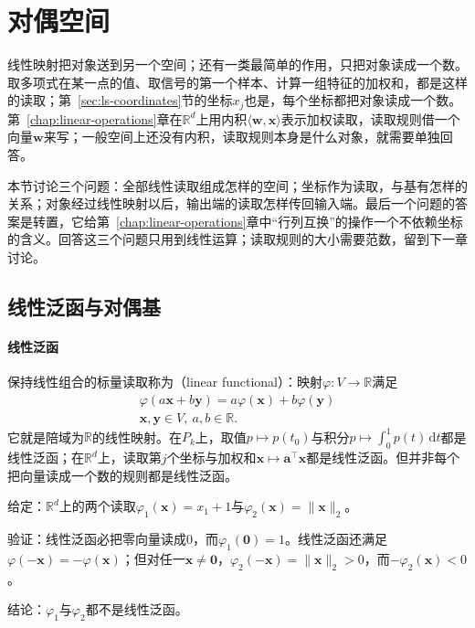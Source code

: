 
\section{对偶空间}
\label{sec:ls-dual-spaces}

线性映射把对象送到另一个空间；还有一类最简单的作用，只把对象读成一个数。取多项式在某一点的值、取信号的第一个样本、计算一组特征的加权和，都是这样的读取；第~\ref{sec:ls-coordinates}节的坐标$x_j$也是，每个坐标都把对象读成一个数。第~\ref{chap:linear-operations}章在$\mathbb R^d$上用内积$\langle\bm w,\bm x\rangle$表示加权读取，读取规则借一个向量$\bm w$来写；一般空间上还没有内积，读取规则本身是什么对象，就需要单独回答。

本节讨论三个问题：全部线性读取组成怎样的空间；坐标作为读取，与基有怎样的关系；对象经过线性映射以后，输出端的读取怎样传回输入端。最后一个问题的答案是转置，它给第~\ref{chap:linear-operations}章中“行列互换”的操作一个不依赖坐标的含义。回答这三个问题只用到线性运算；读取规则的大小需要范数，留到下一章讨论。

\subsection{线性泛函与对偶基}
\label{sec:ls-dual-space}

\paragraph{线性泛函}
保持线性组合的标量读取称为（linear functional）：映射$\varphi:V\to\mathbb R$满足
\[
\begin{gathered}
\varphi(a\bm x+b\bm y)=a\varphi(\bm x)+b\varphi(\bm y)\\
\bm x,\bm y\in V,\ a,b\in\mathbb R.
\end{gathered}
\]
它就是陪域为$\mathbb R$的线性映射。在$P_k$上，取值$p\mapsto p(t_0)$与积分$p\mapsto\int_0^1p(t)\,\mathrm dt$都是线性泛函；在$\mathbb R^d$上，读取第$j$个坐标与加权和$\bm x\mapsto\bm a^\top\bm x$都是线性泛函。但并非每个把向量读成一个数的规则都是线性泛函。
\begin{example}[反例：两个非线性的读取]
\label{ex:ls-nonlinear-readouts}
给定：$\mathbb R^d$上的两个读取$\varphi_1(\bm x)=x_1+1$与$\varphi_2(\bm x)=\lVert\bm x\rVert_2$。

验证：线性泛函必把零向量读成$0$，而$\varphi_1(\bm0)=1$。线性泛函还满足$\varphi(-\bm x)=-\varphi(\bm x)$；但对任一$\bm x\neq\bm0$，$\varphi_2(-\bm x)=\lVert\bm x\rVert_2>0$，而$-\varphi_2(\bm x)<0$。

结论：$\varphi_1$与$\varphi_2$都不是线性泛函。
\end{example}

